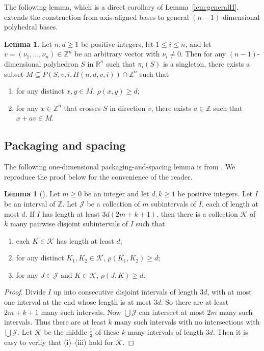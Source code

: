 \documentclass{amsart}
\theoremstyle{definition}
\newtheorem{lemma}[theorem]{Lemma}
\begin{document}
The following lemma, which is a direct corollary of Lemma~\ref{lem:generalH}, extends the construction from axis-aligned bases to general $(n-1)$-dimensional polyhedral bases.

\begin{lemma}\label{lem:H}
Let $n, d\geq 1$ be positive integers, let $1\leq i\leq n$, and let $v=(\nu_1,\dots, \nu_n)\in\mathbb{Z}^n$ be an arbitrary vector with $\nu_i\neq 0$. Then for any $(n-1)$-dimensional polyhedron $S$ in $\mathbb{R}^n$ such that $\pi_i(S)$ is a singleton, there exists a subset $M\subseteq P(S, v, i, H(n, d, v, i))\cap\mathbb{Z}^n$ such that
\begin{enumerate}
\item[(1)] for any distinct $x,y\in M$, $\rho(x,y)\geq d$;
\item[(2)] for any $x\in \mathbb{Z}^n$ that crosses $S$ in direction $v$, there exists $a\in\mathbb{Z}$ such that $x+av\in M$.
\end{enumerate}
\end{lemma}



\subsection{Packaging and spacing}

The following one-dimensional packaging-and-spacing lemma is from \cite{GW25}. We reproduce the proof below for the convenience of the reader.

\begin{lemma}[{\cite[Lemma 3.2]{GW25}}]\label{lem:dim1packaging}
Let $m\geq 0$ be an integer and let $d, k\geq 1$ be positive integers.
Let $I$ be an interval of $\mathbb{Z}$. Let $\mathcal{J}$ be a collection
of $m$ subintervals of $I$, each of length at most $d$. If $I$ has length
at least $3d(2m+k+1)$, then there is a collection $\mathcal{K}$ of $k$ many
pairwise disjoint subintervals of $I$ such that
\begin{enumerate}
\item[(i)] each $K\in\mathcal{K}$ has length at least $d$;
\item[(ii)] for any distinct $K_1, K_2\in\mathcal{K}$,
$\rho(K_1, K_2)\geq d$;
\item[(iii)] for any $J\in\mathcal{J}$ and $K\in\mathcal{K}$,
$\rho(J, K)\geq d$.
\end{enumerate}
\end{lemma}

\begin{proof} Divide $I$ up into consecutive disjoint intervals of length $3d$, with at most one interval at the end whose length is at most $3d$. So there are at least $2m+k+1$ many such intervals. Now $\bigcup \mathcal{J}$ can intersect at most $2m$ many such intervals. Thus there are at least $k$ many such intervals with no intersections with $\bigcup\mathcal{J}$. Let $\mathcal{K}$ be the middle $\frac{1}{3}$ of these $k$ many intervals of length $3d$. Then it is easy to verify that (i)--(iii) hold for $\mathcal{K}$.
\end{proof}
\end{document}
